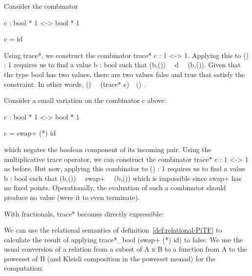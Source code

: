 \documentclass{llncs}
\begin{document}
\begin{example}
Consider the combinator

{{c : bool * 1 <-> bool * 1}} 

{{c = id}}

\noindent Using {{trace*}}, we construct the
combinator {{trace* c : 1 <-> 1}}. Applying this to 
{{() : 1}} requires us to find a value {{b : bool}} such that 
{{(b,()) ~~d~~ (b,())}}. Given that the type {{bool}} 
has two values, there are two values {{false}} and {{true}} that satisfy the 
constraint. In other words, {{() ~~(trace* c)~~() }}.
\end{example}

\begin{example}
\label{ch3:ex:annihilate}
Consider a small variation on the combinator {{c}} above:

{{c : bool * 1 <-> bool * 1}} 

{{c = swap+ (*) id }}

\noindent which negates the boolean component of its incoming
pair. Using the multiplicative trace operator, we can construct the
combinator {{trace* c : 1 <-> 1}} as before. But now, applying this
combinator to {{() : 1}} requires us to find a value {{b : bool}} such
that {{(b,()) ~~swap+~~ (b,())}} which is impossible since {{swap+}} 
has no fixed points.  Operationally, the evaluation of
such a combinator should produce no value (were it to even terminate).
\end{example}

With fractionals, {{trace*}} becomes directly expressible:


We can use the relational semantics of definition~\ref{def:relational-PiTF}
to calculate the result of applying
{{trace*_{bool} (swap+ (*) id)}} to {{false}}.  We use the usual conversion
of a relation from a subset of {{A x B}} to a function from {{A}} to the
powerset of {{B}} (and Kleisli composition in the powerset monad) for
the computation:
\end{document}

